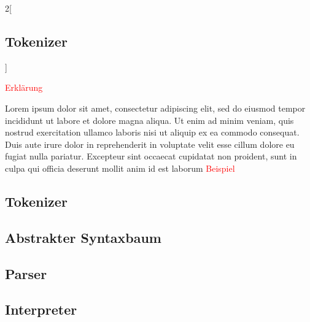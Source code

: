   \begin{paracol}{2}[\subsection{Tokenizer}]
    \label{ssec:Tokenizer}

      \textcolor{red}{Erklärung}

      Lorem ipsum dolor sit amet, consectetur adipiscing elit, sed do eiusmod tempor incididunt ut labore et dolore magna aliqua. Ut enim ad minim veniam, quis nostrud exercitation ullamco laboris nisi ut aliquip ex ea commodo consequat. Duis aute irure dolor in reprehenderit in voluptate velit esse cillum dolore eu fugiat nulla pariatur. Excepteur sint occaecat cupidatat non proident, sunt in culpa qui officia deserunt mollit anim id est laborum
    \switchcolumn
      \textcolor{red}{Beispiel}

    \label{ssec:Abstrakter Syntaxbaum}

    \switchcolumn
  \end{paracol}

  \subsection{Tokenizer}
  \label{ssec:Tokenizer}

  \subsection{Abstrakter Syntaxbaum}
  \label{ssec:Abstrakter Syntaxbaum}

  \subsection{Parser}
  \label{ssec:Parser}

  \subsection{Interpreter}
  \label{ssec:Interpreter}

